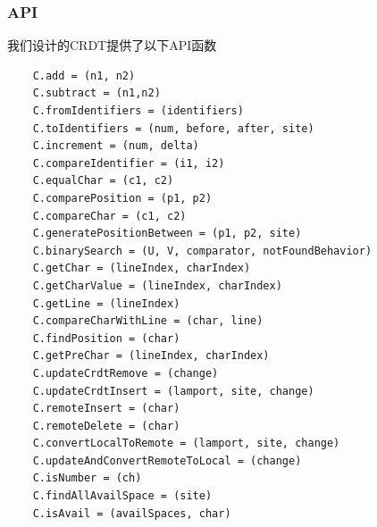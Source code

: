 \documentclass[11pt]{ctexart}
\begin{document}
\subsubsection{API}
我们设计的CRDT提供了以下API函数
\begin{verbatim}
    C.add = (n1, n2)
    C.subtract = (n1,n2)
    C.fromIdentifiers = (identifiers)
    C.toIdentifiers = (num, before, after, site)
    C.increment = (num, delta)
    C.compareIdentifier = (i1, i2)
    C.equalChar = (c1, c2)
    C.comparePosition = (p1, p2)
    C.compareChar = (c1, c2)
    C.generatePositionBetween = (p1, p2, site)
    C.binarySearch = (U, V, comparator, notFoundBehavior)
    C.getChar = (lineIndex, charIndex)
    C.getCharValue = (lineIndex, charIndex)
    C.getLine = (lineIndex)
    C.compareCharWithLine = (char, line)
    C.findPosition = (char)
    C.getPreChar = (lineIndex, charIndex)
    C.updateCrdtRemove = (change)
    C.updateCrdtInsert = (lamport, site, change)
    C.remoteInsert = (char)
    C.remoteDelete = (char)
    C.convertLocalToRemote = (lamport, site, change)
    C.updateAndConvertRemoteToLocal = (change)
    C.isNumber = (ch)
    C.findAllAvailSpace = (site)
    C.isAvail = (availSpaces, char)
\end{verbatim}
\clearpage

\nocite{*}


\end{document}
